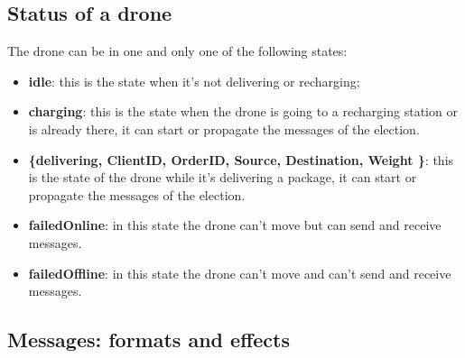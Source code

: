 \documentclass[a4paper, oneside]{memoir}
\begin{document}
\subsection{Status of a drone}
The drone can be in one and only one of the following states:
\begin{itemize}
	\item \textbf{idle}: this is the state when it's not delivering or recharging;
	\item \textbf{charging}: this is the state when the drone is going to a recharging station or is already there, it can start or propagate the messages of the election.
	\item \textbf{\{delivering, ClientID, OrderID, Source, Destination, Weight \}}: this is the state of the drone while it's delivering a package, it can start or propagate the messages of the election.
	\item \textbf{failedOnline}: in this state the drone can't move but can send and receive messages.
	\item \textbf{failedOffline}: in this state the drone can't move and can't send and receive messages.
\end{itemize}


\subsection{Messages: formats and effects}
\end{document}
